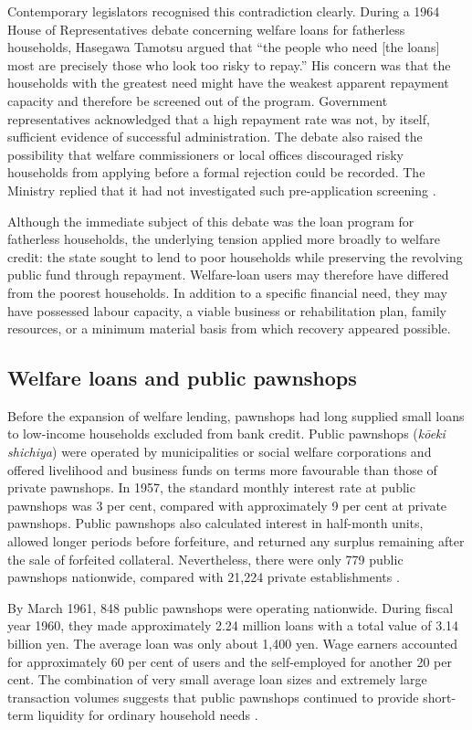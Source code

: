 \documentclass[12pt,a4paper]{article}
\begin{document}
Contemporary legislators recognised this contradiction clearly. During a 1964 House of Representatives debate concerning welfare loans for fatherless households, Hasegawa Tamotsu argued that ``the people who need [the loans] most are precisely those who look too risky to repay.'' His concern was that the households with the greatest need might have the weakest apparent repayment capacity and therefore be screened out of the program. Government representatives acknowledged that a high repayment rate was not, by itself, sufficient evidence of successful administration. The debate also raised the possibility that welfare commissioners or local offices discouraged risky households from applying before a formal rejection could be recorded. The Ministry replied that it had not investigated such pre-application screening \citep{NationalDietLibrary1964}.

Although the immediate subject of this debate was the loan program for fatherless households, the underlying tension applied more broadly to welfare credit: the state sought to lend to poor households while preserving the revolving public fund through repayment. Welfare-loan users may therefore have differed from the poorest households. In addition to a specific financial need, they may have possessed labour capacity, a viable business or rehabilitation plan, family resources, or a minimum material basis from which recovery appeared possible.

\subsection{Welfare loans and public pawnshops}

Before the expansion of welfare lending, pawnshops had long supplied small loans to low-income households excluded from bank credit. Public pawnshops (\emph{k\=oeki shichiya}) were operated by municipalities or social welfare corporations and offered livelihood and business funds on terms more favourable than those of private pawnshops. In 1957, the standard monthly interest rate at public pawnshops was 3 per cent, compared with approximately 9 per cent at private pawnshops. Public pawnshops also calculated interest in half-month units, allowed longer periods before forfeiture, and returned any surplus remaining after the sale of forfeited collateral. Nevertheless, there were only 779 public pawnshops nationwide, compared with 21,224 private establishments \citep{MinistryofHealthandWelfare1958}.

By March 1961, 848 public pawnshops were operating nationwide. During fiscal year 1960, they made approximately 2.24 million loans with a total value of 3.14 billion yen. The average loan was only about 1,400 yen. Wage earners accounted for approximately 60 per cent of users and the self-employed for another 20 per cent. The combination of very small average loan sizes and extremely large transaction volumes suggests that public pawnshops continued to provide short-term liquidity for ordinary household needs \citep{MinistryofHealthandWelfare1961}.
\end{document}
